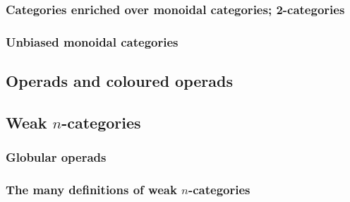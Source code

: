             \begin{definition} \label{def: braided_and_symmetric_monoidal_categories}  
                
            \end{definition}
            
        \subsubsection{Categories enriched over monoidal categories; 2-categories}
        
        \subsubsection{Unbiased monoidal categories}
    
    \subsection{Operads and coloured operads}
    
    \subsection{Weak \texorpdfstring{$n$}{}-categories}
        \subsubsection{Globular operads}
        
        \subsubsection{The many definitions of weak \texorpdfstring{$n$}{}-categories}